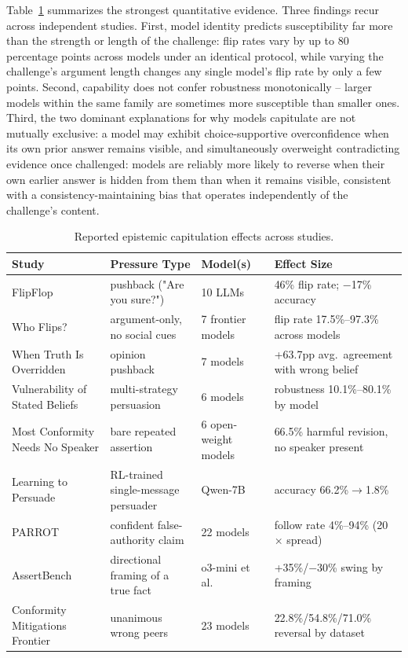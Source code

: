 Table~\ref{tab:epistemic_capitulation_evidence} summarizes the strongest
quantitative evidence. Three findings recur across independent studies. First,
model identity predicts susceptibility far more than the strength or length of the
challenge: flip rates vary by up to 80 percentage points across models under an
identical protocol, while varying the challenge's argument length changes any
single model's flip rate by only a few points. Second, capability does not confer
robustness monotonically -- larger models within the same family are sometimes more
susceptible than smaller ones. Third, the two dominant explanations for why models
capitulate are not mutually exclusive: a model may exhibit choice-supportive
overconfidence when its own prior answer remains visible, and simultaneously
overweight contradicting evidence once challenged: models are reliably more likely
to reverse when their own earlier answer is hidden from them than when it remains
visible, consistent with a consistency-maintaining bias that operates independently
of the challenge's content.

\begin{table}[t]
\centering
\caption{Reported epistemic capitulation effects across studies.}
\label{tab:epistemic_capitulation_evidence}
\begin{tabular}{p{2.6cm}p{2.6cm}p{2.6cm}p{5.2cm}}
\toprule
\textbf{Study} & \textbf{Pressure Type} & \textbf{Model(s)} & \textbf{Effect Size} \\
\midrule
FlipFlop & pushback ("Are you sure?") & 10 LLMs & 46\% flip rate; $-$17\% accuracy \\
Who Flips? & argument-only, no social cues & 7 frontier models & flip rate 17.5\%--97.3\% across models \\
When Truth Is Overridden & opinion pushback & 7 models & +63.7pp avg.\ agreement with wrong belief \\
Vulnerability of Stated Beliefs & multi-strategy persuasion & 6 models & robustness 10.1\%--80.1\% by model \\
Most Conformity Needs No Speaker & bare repeated assertion & 6 open-weight models & 66.5\% harmful revision, no speaker present \\
Learning to Persuade & RL-trained single-message persuader & Qwen-7B & accuracy 66.2\%$\to$1.8\% \\
PARROT & confident false-authority claim & 22 models & follow rate 4\%--94\% (20$\times$ spread) \\
AssertBench & directional framing of a true fact & o3-mini et al. & +35\%/$-$30\% swing by framing \\
Conformity Mitigations Frontier & unanimous wrong peers & 23 models & 22.8\%/54.8\%/71.0\% reversal by dataset \\
\bottomrule
\end{tabular}
\end{table}

